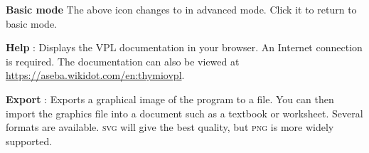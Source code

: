 \textbf{Basic mode} The above icon changes to  in advanced mode.
Click it to return to basic mode.

\newpage

\textbf{Help} : Displays the VPL documentation in your
browser. An Internet connection is required. The documentation can also
be viewed at \href{https://aseba.wikidot.com/en:thymiovpl}{https://aseba.wikidot.com/en:thymiovpl}.

\bigskip

\textbf{Export} : \label{p.export} Exports a graphical
image of the program to a file. You can then import the graphics file
into a document such as a textbook or worksheet. Several formats are
available. \textsc{svg} will give the best quality, but \textsc{png} is
more widely supported.



